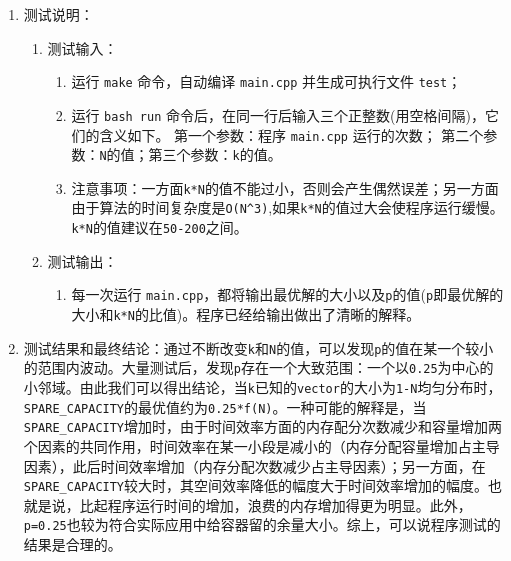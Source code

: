 \documentclass[a4paper,12pt]{article}
\begin{document}
\begin{enumerate}
\begin{enumerate}
\begin{enumerate}
    \end{enumerate}
    \item 测试说明：
    \begin{enumerate}
        \item 测试输入：
        \begin{enumerate}
        \item 运行 \verb|make| 命令，自动编译 \verb|main.cpp| 并生成可执行文件 \verb|test|；
        \item 运行 \verb|bash run| 命令后，{\hei 在同一行后输入三个正整数(用空格间隔)，它们的含义如下。} 第一个参数：程序 \verb|main.cpp| 运行的次数； 第二个参数：\verb|N|的值；第三个参数：\verb|k|的值。
        \item 注意事项：一方面\verb|k*N|的值不能过小，否则会产生偶然误差；另一方面由于算法的时间复杂度是\verb|O(N^3)|,如果\verb|k*N|的值过大会使程序运行缓慢。\verb|k*N|的值{\hei 建议在\verb|50-200|之间。}
        \end{enumerate}
        \item 测试输出：
        \begin{enumerate}
        \item 每一次运行 \verb|main.cpp|，都将输出最优解的大小以及\verb|p|的值(\verb|p|即最优解的大小和\verb|k*N|的比值)。程序已经给输出做出了清晰的解释。
        \end{enumerate}
    \end{enumerate}
    \item 测试结果和最终结论：通过不断改变\verb|k|和\verb|N|的值，可以发现\verb|p|的值在某一个较小的范围内波动。大量测试后，发现\verb|p|存在一个大致范围：一个以\verb|0.25|为中心的小邻域。由此我们可以得出结论，当\verb|k|已知的\verb|vector|的大小为\verb|1-N|均匀分布时，\verb|SPARE_CAPACITY|的最优值约为\verb|0.25*f(N)|。一种可能的解释是，当\verb|SPARE_CAPACITY|增加时，由于时间效率方面的内存配分次数减少和容量增加两个因素的共同作用，时间效率在某一小段是减小的（内存分配容量增加占主导因素），此后时间效率增加（内存分配次数减少占主导因素）；另一方面，在\verb|SPARE_CAPACITY|较大时，其空间效率降低的幅度大于时间效率增加的幅度。也就是说，比起程序运行时间的增加，浪费的内存增加得更为明显。此外，\verb|p=0.25|也较为符合实际应用中给容器留的余量大小。综上，可以说程序测试的结果是合理的。
    \end{enumerate}

\end{enumerate}



\end{document}

